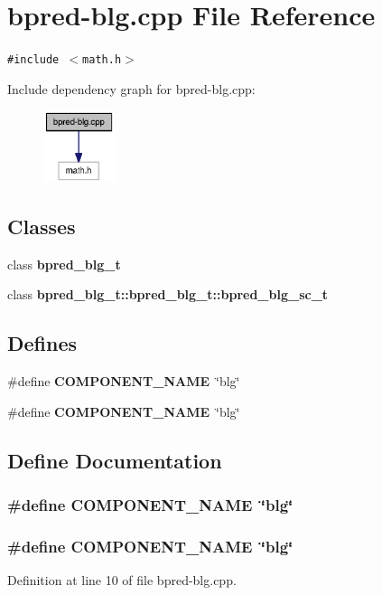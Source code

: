 \section{bpred-blg.cpp File Reference}
\label{bpred-blg_8cpp}
{\tt \#include $<$math.h$>$}\par


Include dependency graph for bpred-blg.cpp:\nopagebreak
\begin{figure}[H]
\begin{center}
\leavevmode
\includegraphics[width=59pt]{bpred-blg_8cpp__incl}
\end{center}
\end{figure}
\subsection*{Classes}
\begin{CompactItemize}
\item 
class {\bf bpred\_\-blg\_\-t}
\item 
class {\bf bpred\_\-blg\_\-t::bpred\_\-blg\_\-t::bpred\_\-blg\_\-sc\_\-t}
\end{CompactItemize}
\subsection*{Defines}
\begin{CompactItemize}
\item 
\#define {\bf COMPONENT\_\-NAME}~\char`\"{}blg\char`\"{}
\item 
\#define {\bf COMPONENT\_\-NAME}~\char`\"{}blg\char`\"{}
\end{CompactItemize}


\subsection{Define Documentation}
\subsubsection[{COMPONENT\_\-NAME}]{\setlength{\rightskip}{0pt plus 5cm}\#define COMPONENT\_\-NAME~\char`\"{}blg\char`\"{}}\label{zesto-bpred_8cpp_9146ade7ce24e3db226a973a59063892}


\subsubsection[{COMPONENT\_\-NAME}]{\setlength{\rightskip}{0pt plus 5cm}\#define COMPONENT\_\-NAME~\char`\"{}blg\char`\"{}}\label{bpred-blg_8cpp_9146ade7ce24e3db226a973a59063892}




Definition at line 10 of file bpred-blg.cpp.